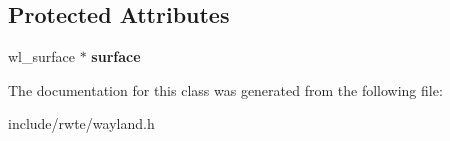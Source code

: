 \subsection*{Protected Attributes}
\begin{DoxyCompactItemize}
\item 
\mbox{\label{classwayland_1_1Surface_a9801745fd666e574aa44d132b6aa79f3}} 
wl\+\_\+surface $\ast$ {\bfseries surface}
\end{DoxyCompactItemize}


The documentation for this class was generated from the following file\+:\begin{DoxyCompactItemize}
\item 
include/rwte/wayland.\+h\end{DoxyCompactItemize}
